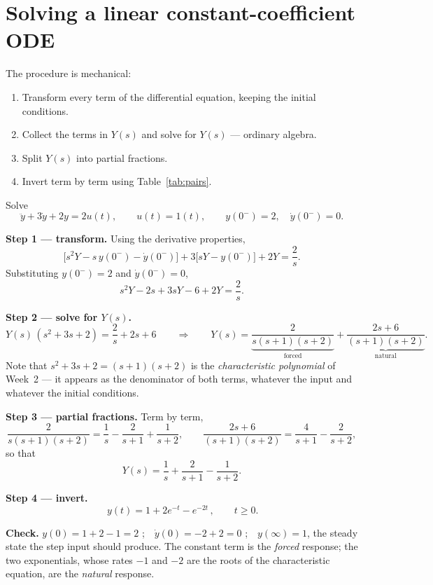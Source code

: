 \documentclass[11pt,a4paper]{article}
\begin{document}
\section{Solving a linear constant-coefficient ODE}
\label{sec:ode-solution}

The procedure is mechanical:

\begin{enumerate}[leftmargin=*]
\item Transform every term of the differential equation, keeping the initial
      conditions.
\item Collect the terms in $Y(s)$ and solve for $Y(s)$ --- ordinary algebra.
\item Split $Y(s)$ into partial fractions.
\item Invert term by term using Table~\ref{tab:pairs}.
\end{enumerate}

\begin{workedex}[breakable, title=Worked example 3.1 --- an ODE with non-zero initial conditions]
Solve
\[
  \ddot y + 3\dot y + 2y = 2u(t), \qquad u(t)=1(t), \qquad
  y(0^-)=2, \quad \dot y(0^-)=0 .
\]

\textbf{Step 1 --- transform.} Using the derivative properties,
\[
  \bigl[s^{2}Y - s\,y(0^-) - \dot y(0^-)\bigr]
  + 3\bigl[sY - y(0^-)\bigr] + 2Y = \frac{2}{s} .
\]
Substituting $y(0^-)=2$ and $\dot y(0^-)=0$,
\[
  s^{2}Y - 2s + 3sY - 6 + 2Y = \frac{2}{s} .
\]

\textbf{Step 2 --- solve for $Y(s)$.}
\[
  Y(s)\,(s^{2}+3s+2) = \frac{2}{s} + 2s + 6
  \qquad\Longrightarrow\qquad
  Y(s) = \underbrace{\frac{2}{s(s+1)(s+2)}}_{\text{forced}}
       + \underbrace{\frac{2s+6}{(s+1)(s+2)}}_{\text{natural}} .
\]
Note that $s^{2}+3s+2=(s+1)(s+2)$ is the \emph{characteristic polynomial} of
Week~2 --- it appears as the denominator of both terms, whatever the input and
whatever the initial conditions.

\textbf{Step 3 --- partial fractions.} Term by term,
\[
  \frac{2}{s(s+1)(s+2)} = \frac{1}{s} - \frac{2}{s+1} + \frac{1}{s+2},
  \qquad
  \frac{2s+6}{(s+1)(s+2)} = \frac{4}{s+1} - \frac{2}{s+2},
\]
so that
\[
  Y(s) = \frac{1}{s} + \frac{2}{s+1} - \frac{1}{s+2} .
\]

\textbf{Step 4 --- invert.}
\[
  \boxed{\,y(t) = 1 + 2e^{-t} - e^{-2t}\,}, \qquad t\ge 0 .
\]

\textbf{Check.} $y(0)=1+2-1=2$ \checkmark;\ \ $\dot y(0)=-2+2=0$ \checkmark;\ \
$y(\infty)=1$, the steady state the step input should produce. The constant
term is the \emph{forced} response; the two exponentials, whose rates $-1$ and
$-2$ are the roots of the characteristic equation, are the \emph{natural}
response.
\end{workedex}
\end{document}
